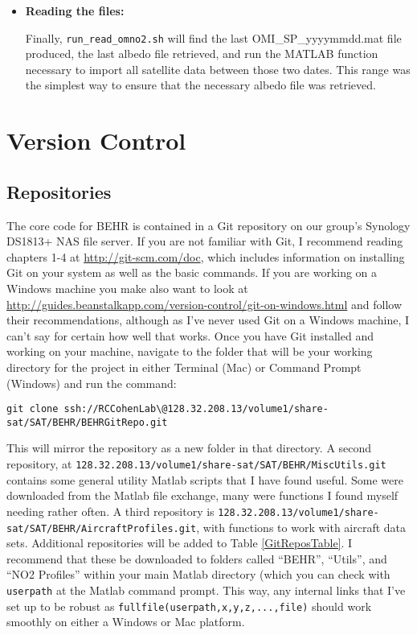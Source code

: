 \documentclass[12pt]{article}
\begin{document}
\begin{itemize}
			\item \textbf{Reading the files:}
			
			Finally, \texttt{run\_read\_omno2.sh} will find the last OMI\_SP\_yyyymmdd.mat file produced, the last albedo file retrieved, and run the MATLAB function necessary to import all satellite data between those two dates. This range was the simplest way to ensure that the necessary albedo file was retrieved.
			
		\end{itemize}
		
		
		
\section{Version Control}\label{sec:version-control}
	\subsection{Repositories}
	The core code for BEHR is contained in a Git repository on our group's Synology DS1813+ NAS file server.  If you are not familiar with Git, I recommend reading chapters 1-4 at \url{http://git-scm.com/doc}, which includes information on installing Git on your system as well as the basic commands.  If you are working on a Windows machine you make also want to look at \url{http://guides.beanstalkapp.com/version-control/git-on-windows.html} and follow their recommendations, although as I've never used Git on a Windows machine, I can't say for certain how well that works.  
	Once you have Git installed and working on your machine, navigate to the folder that will be your working directory for the project in either Terminal (Mac) or Command Prompt (Windows) and run the command:

\vspace{12pt}
\lstset{basicstyle=\scriptsize\ttfamily}
\begin{lstlisting}
git clone ssh://RCCohenLab\@128.32.208.13/volume1/share-sat/SAT/BEHR/BEHRGitRepo.git
\end{lstlisting}
\lstset{basicstyle=\ttfamily}

	
\vspace{12pt}
\noindent This will mirror the repository as a new folder in that directory.  A second repository, at \texttt{128.32.208.13/volume1/share-sat/SAT/BEHR/MiscUtils.git} contains some general utility Matlab scripts that I have found useful.  Some were downloaded from the Matlab file exchange, many were functions I found myself needing rather often.  A third repository is \texttt{128.32.208.13/volume1/share-sat/SAT/BEHR/AircraftProfiles.git}, with functions to work with aircraft data sets.  Additional repositories will be added to Table \ref{GitReposTable}.  I recommend that these be downloaded to folders called ``BEHR'', ``Utils'', and ``NO2 Profiles'' within your main Matlab directory (which you can check with \texttt{userpath} at the Matlab command prompt.  This way, any internal links that I've set up to be robust as \texttt{fullfile(userpath,x,y,z,...,file)} should work smoothly on either a Windows or Mac platform.
\end{document}
